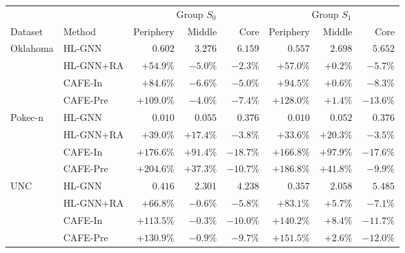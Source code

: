 \begin{tabular}{llrrrrrr}
\toprule
 & & \multicolumn{3}{c}{Group $S_0$} & \multicolumn{3}{c}{Group $S_1$} \\
\cmidrule(lr){3-5}\cmidrule(lr){6-8}
Dataset & Method & Periphery & Middle & Core & Periphery & Middle & Core \\
\midrule
Oklahoma & HL-GNN & $0.602$ & $3.276$ & $6.159$ & $0.557$ & $2.698$ & $5.652$ \\
 & HL-GNN+RA & $+54.9\%$ & $-5.0\%$ & $-2.3\%$ & $+57.0\%$ & $+0.2\%$ & $-5.7\%$ \\
 & CAFE-In & $+84.6\%$ & $-6.6\%$ & $-5.0\%$ & $+94.5\%$ & $+0.6\%$ & $-8.3\%$ \\
 & CAFE-Pre & $+109.0\%$ & $-4.0\%$ & $-7.4\%$ & $+128.0\%$ & $+1.4\%$ & $-13.6\%$ \\
\addlinespace[2pt]
Pokec-n & HL-GNN & $0.010$ & $0.055$ & $0.376$ & $0.010$ & $0.052$ & $0.376$ \\
 & HL-GNN+RA & $+39.0\%$ & $+17.4\%$ & $-3.8\%$ & $+33.6\%$ & $+20.3\%$ & $-3.5\%$ \\
 & CAFE-In & $+176.6\%$ & $+91.4\%$ & $-18.7\%$ & $+166.8\%$ & $+97.9\%$ & $-17.6\%$ \\
 & CAFE-Pre & $+204.6\%$ & $+37.3\%$ & $-10.7\%$ & $+186.8\%$ & $+41.8\%$ & $-9.9\%$ \\
\addlinespace[2pt]
UNC & HL-GNN & $0.416$ & $2.301$ & $4.238$ & $0.357$ & $2.058$ & $5.485$ \\
 & HL-GNN+RA & $+66.8\%$ & $-0.6\%$ & $-5.8\%$ & $+83.1\%$ & $+5.7\%$ & $-7.1\%$ \\
 & CAFE-In & $+113.5\%$ & $-0.3\%$ & $-10.0\%$ & $+140.2\%$ & $+8.4\%$ & $-11.7\%$ \\
 & CAFE-Pre & $+130.9\%$ & $-0.9\%$ & $-9.7\%$ & $+151.5\%$ & $+2.6\%$ & $-12.0\%$ \\
\bottomrule
\end{tabular}
